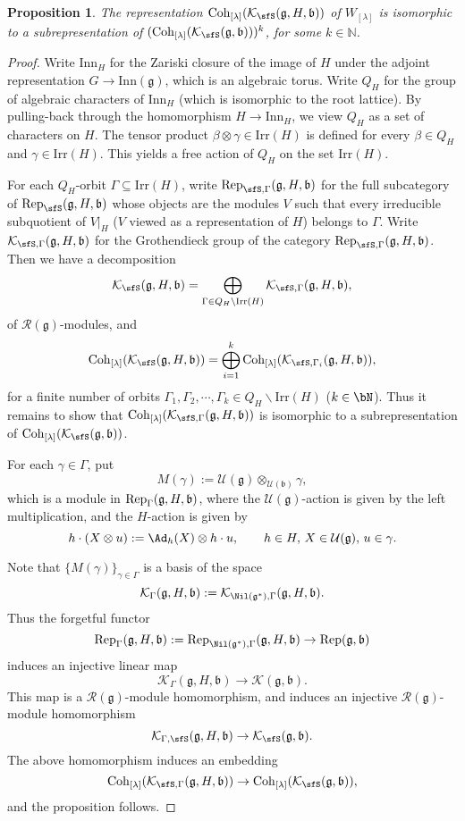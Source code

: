 \documentclass[12pt,a4paper]{amsart}
\def\subset{\subseteq}
\newcommand{\BN}{{\mathbb {N}}}
\newcommand{\CK}{{\mathcal {K}}}
\newcommand{\CU}{{\mathcal {U}}}
\newcommand{\g}{\mathfrak g}
\renewcommand{\b}{\mathfrak b}
\numberwithin{equation}{section}
\newtheorem{prop}[thm]{Proposition}
\theoremstyle{remark}
\def\Irr{\mathrm{Irr}}
\def\Coh{\mathrm{Coh}}
\def\Inn{\mathrm{Inn}}
\newcommand{\Lam}{{[\lambda]}}
\begin{document}
 \begin{prop}\label{lem0022}
The representation $\Coh_{\Lam}(\CK_\sfS(\g,H, \b))$ of $W_{[\lambda]}$ is isomorphic to a subrepresentation of $(\Coh_{\Lam}(\CK_\sfS(\g, \b)))^k$, for some $k\in \BN$.
     \end{prop}
\begin{proof}


Write $\Inn_H$ for the Zariski closure of the image of $H$ under  the adjoint representation $G\rightarrow \Inn(\g)$, which is an algebraic torus. Write $Q_H$ for the group of algebraic characters of $\Inn_H$ (which is isomorphic to  the root lattice). By pulling-back through the homomorphism $H\rightarrow \Inn_H$, we view $Q_H$ as a set of characters on $H$.
The tensor product $\beta\otimes \gamma\in \Irr(H)$ is defined for every $\beta\in Q_H$ and $\gamma\in \Irr(H)$. This yields a free action of $Q_H$ on the set $\Irr(H)$.

For each $Q_H$-orbit $\Gamma\subset \Irr(H)$, write $\Rep_{\sfS,\Gamma}(\g,H,\b)$ for the full subcategory of $\Rep_\sfS(\g,H,\b)$ whose objects are  the modules $V$ such that every irreducible subquotient of $V|_H$ ($V$ viewed as a representation of $H$) belongs to $\Gamma$. Write $\CK_{\sfS,\Gamma}(\g,H,\b)$ for the  Grothendieck group of the category $\Rep_{\sfS,\Gamma}(\g,H,\b)$.
Then  we have a decomposition
\[
\CK_\sfS(\g,H,\b)=\bigoplus_{\Gamma\in Q_H\backslash \Irr(H)} \CK_{\sfS,\Gamma}(\g,H,\b),
\]
of $\mathcal R(\g)$-modules, and
\[
\Coh_{\Lam}(\CK_\sfS(\g,H, \b))=\bigoplus_{i=1}^k  \Coh_{\Lam}(\CK_{ \sfS,\Gamma_i}(\g,H,\b)),
\]
for a finite number of orbits $\Gamma_1, \Gamma_2, \cdots, \Gamma_k\in Q_H\backslash \Irr(H)$ ($k\in \bN$). Thus it remains to show that $ \Coh_{\Lam}(\CK_{ \sfS,\Gamma}(\g,H,\b))$ is isomorphic to a subrepresentation of  $\Coh_{\Lam}(\CK_\sfS(\g, \b))$.



For each $\gamma\in \Gamma$, put
\[
  M(\gamma):=\CU(\g)\otimes_{\CU(\b)} \gamma,
\]
which is a module in $\Rep_\Gamma(\g,H,\b)$, where the $\CU(\g)$-action is given by the left multiplication, and the $H$-action is given by
\[
 h\cdot (X\otimes u):=\Ad_h(X)\otimes h \cdot u, \qquad h\in H, \, X\in \CU(\g),\, u\in \gamma.
\]

Note that $\{ M(\gamma)\}_{\gamma\in \Gamma}$ is a basis of the space %
\[
\CK_{\Gamma}(\g,H,\b):=\CK_{\Nil(\g^*),\Gamma}(\g,H,\b).
\]
Thus the forgetful functor
\[
   \Rep_{\Gamma}(\g,H,\b):=\Rep_{\Nil(\g^*),\Gamma}(\g,H,\b)\rightarrow  \Rep(\g,\b)
\]
induces an injective linear map
\[
    \CK_{\Gamma}(\g,H,\b)\rightarrow  \CK(\g,\b).
\]
This map is a $\mathcal R(\g)$-module homomorphism, and induces an injective
$\mathcal R(\g)$-module homomorphism
\[
    \CK_{\Gamma,\sfS}(\g,H,\b)\rightarrow  \CK_\sfS(\g,\b).
\]
The above homomorphism induces an embedding
\[
    \Coh_{\Lam}(\CK_{ \sfS,\Gamma}(\g,H,\b))\rightarrow  \Coh_{\Lam}(\CK_\sfS(\g,\b)),
\]
and the proposition follows.
\end{proof}
\end{document}
